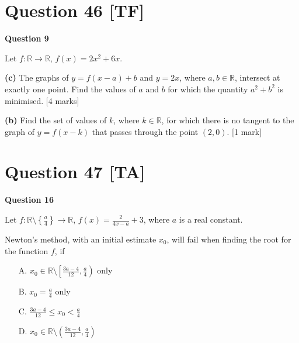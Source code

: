 \documentclass[10pt,a4paper]{article}
\begin{document}
\vspace{9\baselineskip}

\hrulefill

\section*{Question 46 [TF]}

\textbf{Question 9}

Let $f : \mathbb{R} \to \mathbb{R}$, $f(x) = 2x^2 + 6x$.

\textbf{(c)} The graphs of $y = f(x - a) + b$ and $y = 2x$, where $a, b \in \mathbb{R}$, intersect at exactly one point. Find the values of $a$ and $b$ for which the quantity $a^2 + b^2$ is minimised. \hfill [4 marks]

\vspace{9\baselineskip}

\textbf{(b)} Find the set of values of $k$, where $k \in \mathbb{R}$, for which there is no tangent to the graph of $y = f(x - k)$ that passes through the point $(2,0)$. \hfill [1 mark]

\vspace{9\baselineskip}

\hrulefill

\section*{Question 47 [TA]}

\textbf{Question 16}

Let $f : \mathbb{R} \setminus \left\{\frac{a}{4}\right\} \to \mathbb{R}$, $f(x) = \frac{2}{4x-a} + 3$, where $a$ is a real constant.

Newton's method, with an initial estimate $x_0$, will fail when finding the root for the function $f$, if

\begin{enumerate}
    \item[A.] $x_0 \in \mathbb{R} \setminus \left[\frac{3a-4}{12}, \frac{a}{4}\right)$ only
    \item[B.] $x_0 = \frac{a}{4}$ only
    \item[C.] $\frac{3a-4}{12} \leq x_0 < \frac{a}{4}$
    \item[D.] $x_0 \in \mathbb{R} \setminus \left(\frac{3a-4}{12}, \frac{a}{4}\right)$
\end{enumerate}

\vspace{9\baselineskip}

\hrulefill
\end{document}
